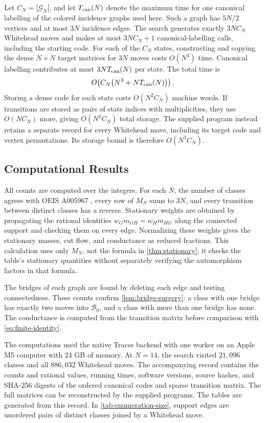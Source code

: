 \documentclass[11pt]{article}
\newcommand{\C}{\mathcal G}
\theoremstyle{plain}
\theoremstyle{definition}
\numberwithin{equation}{section}
\begin{document}
Let $C_N=|\C_N|$, and let $T_{\rm can}(N)$ denote the maximum time for one
canonical labelling of the colored incidence graphs used here.  Such a graph
has $5N/2$ vertices and at most $3N$ incidence edges.  The search generates
exactly $3NC_N$ Whitehead moves and makes at most $3NC_N+1$
canonical-labelling calls, including the starting code.  For each of the $C_N$
states, constructing and copying the dense $N\times N$ target matrices for
$3N$ moves costs $O(N^3)$ time.  Canonical
labelling contributes at most $3N T_{\rm can}(N)$ per state.  The total time is
\[
 O\!\left(C_N\bigl(N^3+N T_{\rm can}(N)\bigr)\right).
\]
Storing a dense code for each state costs $O(N^2C_N)$ machine words.  If
transitions are stored as pairs of state indices with multiplicities, they
use $O(NC_N)$ more, giving $O(N^2C_N)$ total storage.  The supplied program
instead retains a separate record for every Whitehead move, including its
target code and vertex permutations.  Its storage bound is therefore
$O(N^3C_N)$.

\subsection{Computational Results}

All counts are computed over the integers.  For each $N$, the number of
classes agrees with OEIS A005967 \cite{OEISA005967}, every row of $M_N$ sums
to $3N$, and every transition between distinct classes has a reverse.
Stationary weights are obtained by propagating the rational identities
$w_Gm_{GH}=w_Hm_{HG}$ along the connected support and checking them on every
edge.  Normalizing these weights gives the stationary masses, cut flow, and
conductance as reduced fractions.  This calculation uses only $M_N$, not the
formula in \cref{thm:stationary}; it checks the table's stationary quantities
without separately verifying the automorphism factors in that formula.

The bridges of each graph are found by deleting each edge and testing
connectedness.  These counts confirm \cref{lem:bridge-surgery}: a class with
one bridge has exactly two moves into $\mathcal B_0$, and a class with more
than one bridge has none.  The conductance is computed from the transition
matrix before comparison with \eqref{eq:finite-identity}.

The computations used the native Traces backend with one worker on an Apple
M5 computer with 24 GB of memory.  At $N=14$, the search visited $21{,}096$
classes and all $886{,}032$ Whitehead moves.  The accompanying record contains
the counts and rational values, running times, software versions, source
hashes, and SHA-256 digests of the ordered canonical codes and sparse
transition matrix.  The full matrices can be reconstructed by the supplied
programs.  The tables are generated from this record.  In
\cref{tab:enumeration-size}, support edges are unordered pairs of distinct
classes joined by a Whitehead move.
\end{document}
